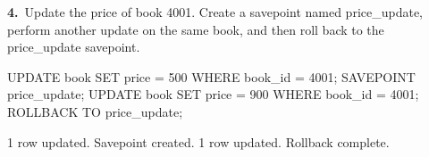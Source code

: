 \noindent\begin{minipage}{\linewidth}
\begingroup{}
{\fontsize{14}{17}\selectfont\textbf{4.}}\ Update the price of book 4001. Create a savepoint named price\_update, perform another update on the same book, and then roll back to the price\_update savepoint.\par
\endgroup\vspace{12pt}


\begin{sqlcode}
UPDATE book SET price = 500 WHERE book_id = 4001;
SAVEPOINT price_update;
UPDATE book SET price = 900 WHERE book_id = 4001;
ROLLBACK TO price_update;
\end{sqlcode}

\vspace{18pt}


\begin{sqlout}[fontsize=\small]
1 row updated.
Savepoint created.
1 row updated.
Rollback complete.
\end{sqlout}
\end{minipage}\par\vspace{24pt}

